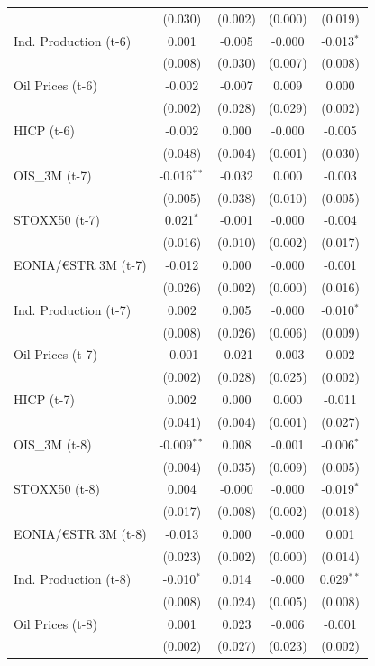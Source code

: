 \begin{longtable}[t]{lcccc}
 & (0.030) & (0.002) & (0.000) & \vphantom{1} (0.019)\\
Ind. Production (t-6) & 0.001 & -0.005 & -0.000 & -0.013$^{*}$\\
 & (0.008) & (0.030) & (0.007) & (0.008)\\
Oil Prices (t-6) & -0.002 & -0.007 & 0.009 & 0.000\\
 & (0.002) & (0.028) & (0.029) & (0.002)\\
HICP (t-6) & -0.002 & 0.000 & -0.000 & -0.005\\
 & (0.048) & (0.004) & (0.001) & (0.030)\\
OIS\_3M (t-7) & -0.016$^{**}$ & -0.032 & 0.000 & -0.003\\
 & (0.005) & (0.038) & (0.010) & (0.005)\\
STOXX50 (t-7) & 0.021$^{*}$ & -0.001 & -0.000 & -0.004\\
 & (0.016) & (0.010) & (0.002) & (0.017)\\
EONIA/€STR 3M (t-7) & -0.012 & 0.000 & -0.000 & -0.001\\
 & (0.026) & (0.002) & (0.000) & (0.016)\\
Ind. Production (t-7) & 0.002 & 0.005 & -0.000 & -0.010$^{*}$\\
 & (0.008) & (0.026) & (0.006) & (0.009)\\
Oil Prices (t-7) & -0.001 & -0.021 & -0.003 & 0.002\\
 & (0.002) & (0.028) & (0.025) & (0.002)\\
HICP (t-7) & 0.002 & 0.000 & 0.000 & -0.011\\
 & (0.041) & (0.004) & (0.001) & (0.027)\\
OIS\_3M (t-8) & -0.009$^{**}$ & 0.008 & -0.001 & -0.006$^{*}$\\
 & (0.004) & (0.035) & (0.009) & (0.005)\\
STOXX50 (t-8) & 0.004 & -0.000 & -0.000 & -0.019$^{*}$\\
 & (0.017) & (0.008) & (0.002) & (0.018)\\
EONIA/€STR 3M (t-8) & -0.013 & 0.000 & -0.000 & 0.001\\
 & (0.023) & (0.002) & (0.000) & (0.014)\\
Ind. Production (t-8) & -0.010$^{*}$ & 0.014 & -0.000 & 0.029$^{**}$\\
 & (0.008) & (0.024) & (0.005) & (0.008)\\
Oil Prices (t-8) & 0.001 & 0.023 & -0.006 & -0.001\\
 & (0.002) & (0.027) & (0.023) & (0.002)\\

\end{longtable}
